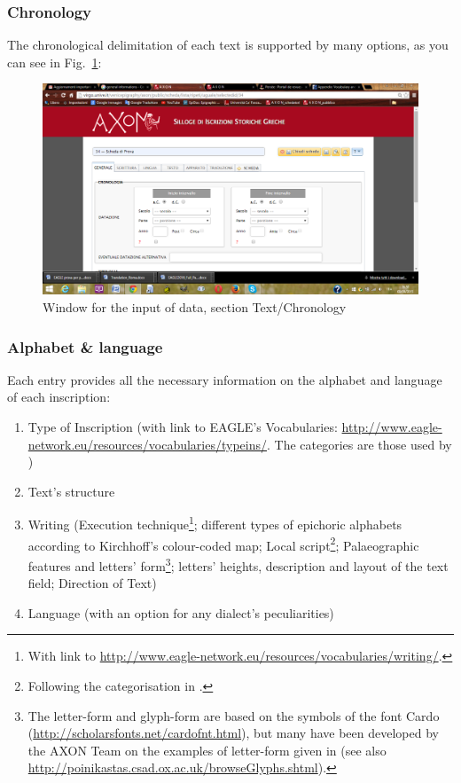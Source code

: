\documentclass[amsthm,ebook]{saparticle}
\begin{document}
\subsubsection{Chronology}


\noindent The chronological delimitation of each text is supported by many options, as you can see in Fig.~\ref{fig:1}:

\begin{figure}[!bp]
\centering
 \includegraphics[width=\columnwidth]{EAGLE2016FullPaperrevised-img001.png}
\caption{Window for the input of data, section Text/Chronology}
\label{fig:1}
\end{figure}




\subsubsection{Alphabet \& language}





\noindent Each entry provides all the necessary information on the alphabet and language of each inscription:

\begin{enumerate}
\renewcommand{\theenumi}{\alph{enumi}}
\item Type of Inscription (with link to EAGLE’s Vocabularies:
\url{http://www.eagle-network.eu/resources/vocabularies/typeins/}. The categories are those used by \citet{Guarducci:1967aa})
\item Text’s structure
\item Writing (Execution technique\footnote{ With link to \url{http://www.eagle-network.eu/resources/vocabularies/writing/}.};
different types of epichoric alphabets according to Kirchhoff’s colour-coded map; Local script\footnote{ Following the
categorisation in \citet{jeffery_local_1990}.}; Palaeographic features and letters’ form\footnote{ The letter-form and glyph-form are
based on the symbols of the font Cardo (\url{http://scholarsfonts.net/cardofnt.html}), but many have been developed by the
AXON Team on the examples of letter-form given in \citealp{jeffery_local_1990} (see also
\url{http://poinikastas.csad.ox.ac.uk/browseGlyphs.shtml}).}; letters’ heights, description and layout of the text field;
Direction of Text)
\item Language (with an option for any dialect’s peculiarities)
\end{enumerate}
\end{document}
